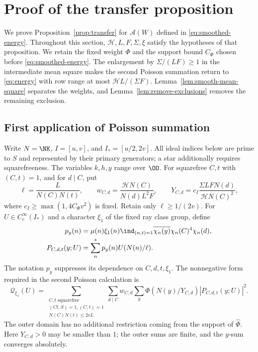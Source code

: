 \section{Proof of the transfer proposition}\label{sec:transfer-proof}

We prove Proposition~\ref{prop:transfer} for
$\mathcal A(W)$ defined in \eqref{eq:smoothed-energy}.
Throughout this section, $\mathcal H,L,F,\Sigma,\xi$ satisfy the
hypotheses of that proposition. We retain the fixed weight $\Phi$
and the support bound $C_\Phi$ chosen before \eqref{eq:smoothed-energy}.
The enlargement by $\Sigma/(LF)\ge1$ in the intermediate mean square
makes the second Poisson summation return to \eqref{eq:energy} with
row range at most $\mathcal HL/(\Sigma F)$.
Lemma~\ref{lem:smooth-mean-square} separates the weights, and
Lemma~\ref{lem:remove-exclusions} removes the remaining exclusion.

\subsection{First application of Poisson summation}
Write $N=\NK$, $I=[u,v]$, and $I_*=[u/2,2v]$.
All ideal indices below are prime to $S$ and represented by their
primary generators; a star additionally requires squarefreeness.
The variables $k,h,y$ range over $\OO$.
For squarefree $C,t$ with $(C,t)=1$, and for $d\mid C$, put
\[
 \ell=\frac{L}{N(C)N(t)},\qquad
 w_{C,d}=\frac{\mathcal H N(C)}{N(d)L^2F},\qquad
 Y_{C,d}=c_I\frac{\Sigma LFN(d)}{\mathcal H N(C)^2},
\]
where $c_I\ge\max(1,4C_\Phi v^2)$ is fixed. Retain only
$\ell\ge1/(2v)$. For $U\in C_c^\infty(I_*)$ and a character
$\xi_1$ of the fixed ray class group, define
\begin{equation}\label{eq:P}
 \begin{aligned}
 p_y(n)&=\mu(n)\xi_1(n)\ind_{(n,t)=1}
       \overline{\chi_n(y)}\chi_n(C)^4\chi_n(d),\\
 P_{C,d,t}(y;U)&=\sum_n^*p_y(n)U(N(n)/\ell).
 \end{aligned}
\end{equation}
The notation $p_y$ suppresses its dependence on $C,d,t,\xi_1$.
The nonnegative form required in the second Poisson calculation is
\begin{equation}\label{eq:first-transfer-forms}
 \mathcal Q_{\xi_1}(U)=
 \sum_{\substack{C,t\text{ squarefree}\\(Ct,S)=1, (C,t)=1\\
                  N(C)N(t)\le2vL}}
 \sum_{d\mid C}w_{C,d}
\sum_y\Phi(N(y)/Y_{C,d})|P_{C,d,t}(y;U)|^2.
\end{equation}
The outer domain has no additional restriction coming from the support of $\widehat\Phi$. Here $Y_{C,d}>0$ may be smaller than $1$; the outer
sums are finite, and the $y$-sum converges absolutely.

